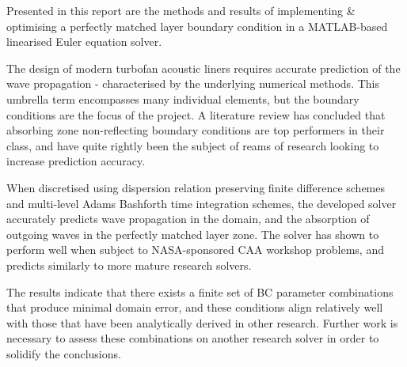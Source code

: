 Presented in this report are the methods and results of implementing \& optimising a perfectly matched layer boundary condition in a MATLAB-based linearised Euler equation solver. \par
The design of modern turbofan acoustic liners requires accurate prediction of the wave propagation - characterised by the underlying numerical methods. This umbrella term encompasses many individual elements, but the boundary conditions are the focus of the project.
A literature review has concluded that absorbing zone non-reflecting boundary conditions are top performers in their class, and have quite rightly been the subject of reams of research looking to increase prediction accuracy.


When discretised using dispersion relation preserving finite difference schemes and multi-level Adams Bashforth time integration schemes, the developed solver accurately predicts wave propagation in the domain, and the absorption of outgoing waves in the perfectly matched layer zone. The solver has shown to perform well when subject to NASA-sponsored CAA workshop problems, and predicts similarly to more mature research solvers.


The results indicate that there exists a finite set of BC parameter combinations that produce minimal domain error, and these conditions align relatively well with those that have been analytically derived in other research. Further work is necessary to assess these combinations on another research solver in order to solidify the conclusions.

